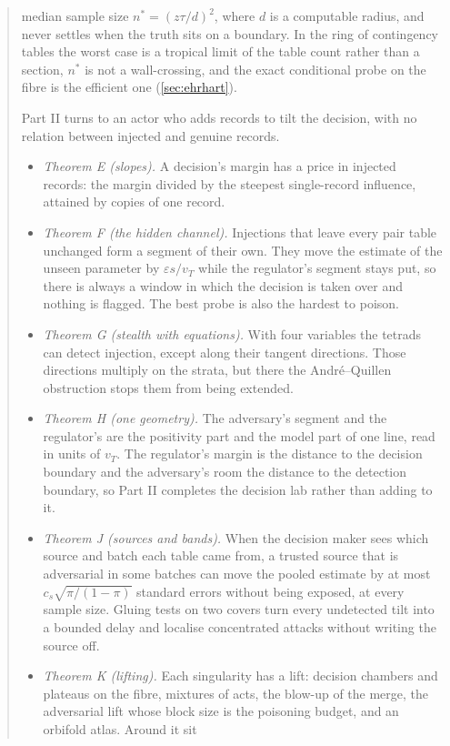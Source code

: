 \documentclass[11pt]{article}
\theoremstyle{definition}\newtheorem{definition}{Definition}\newtheorem{remark}{Remark}
\begin{document}
\begin{abstract}
\begin{itemize}
  median sample size $n^*=(z\tau/d)^2$, where $d$ is a computable radius, and never settles when the truth sits on a boundary.
  In the ring of contingency tables the worst case is a tropical limit of the table count rather than a section, $n^*$ is not a
  wall-crossing, and the exact conditional probe on the fibre is the efficient one (\cref{sec:ehrhart}).
\end{itemize}
Part II turns to an actor who adds records to tilt the decision, with no relation between injected and genuine records.
\begin{itemize}
\item \emph{Theorem E (slopes).} A decision's margin has a price in injected records: the margin divided by the steepest single-record
  influence, attained by copies of one record.
\item \emph{Theorem F (the hidden channel).} Injections that leave every pair table unchanged form a segment of their own. They move the
  estimate of the unseen parameter by $\varepsilon s/v_T$ while the regulator's segment stays put, so there is always a window in which
  the decision is taken over and nothing is flagged. The best probe is also the hardest to poison.
\item \emph{Theorem G (stealth with equations).} With four variables the tetrads can detect injection, except along their tangent
  directions. Those directions multiply on the strata, but there the André--Quillen obstruction stops them from being extended.
\item \emph{Theorem H (one geometry).} The adversary's segment and the regulator's are the positivity part and the model part of one
  line, read in units of $v_T$. The regulator's margin is the distance to the decision boundary and the adversary's room the distance
  to the detection boundary, so Part II completes the decision lab rather than adding to it.
\item \emph{Theorem J (sources and bands).} When the decision maker sees which source and batch each table came from, a trusted source
  that is adversarial in some batches can move the pooled estimate by at most $c_s\sqrt{\pi/(1-\pi)}$ standard errors without being
  exposed, at every sample size. Gluing tests on two covers turn every undetected tilt into a bounded delay and localise concentrated
  attacks without writing the source off.
\item \emph{Theorem K (lifting).} Each singularity has a lift: decision chambers and plateaus on the fibre, mixtures of acts, the
  blow-up of the merge, the adversarial lift whose block size is the poisoning budget, and an orbifold atlas. Around it sit

\end{itemize}
\end{abstract}
\end{document}
